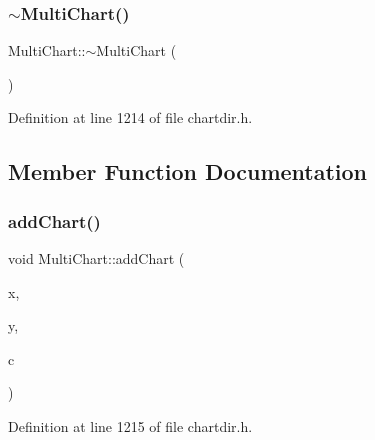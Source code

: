 \subsubsection{\texorpdfstring{$\sim$\+Multi\+Chart()}{~MultiChart()}}
{\footnotesize\ttfamily Multi\+Chart\+::$\sim$\+Multi\+Chart (\begin{DoxyParamCaption}{ }\end{DoxyParamCaption})\hspace{0.3cm}{\ttfamily [inline]}}



Definition at line 1214 of file chartdir.\+h.



\subsection{Member Function Documentation}
\mbox{\label{class_multi_chart_a8a41f5565f6914264044ddd99af9a6e9}} 
\subsubsection{\texorpdfstring{add\+Chart()}{addChart()}}
{\footnotesize\ttfamily void Multi\+Chart\+::add\+Chart (\begin{DoxyParamCaption}\item[{int}]{x,  }\item[{int}]{y,  }\item[{\hyperlink{class_base_chart}{Base\+Chart} $\ast$}]{c }\end{DoxyParamCaption})\hspace{0.3cm}{\ttfamily [inline]}}



Definition at line 1215 of file chartdir.\+h.

